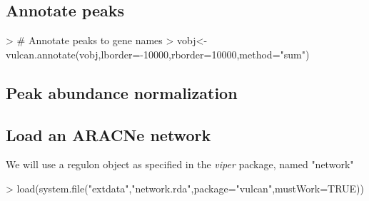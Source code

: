 \documentclass{article}
\begin{document}
\subsection{Annotate peaks}
\begin{Schunk}
\begin{Sinput}
> # Annotate peaks to gene names
> vobj<-vulcan.annotate(vobj,lborder=-10000,rborder=10000,method="sum")
\end{Sinput}
\end{Schunk}

\subsection{Peak abundance normalization}
\begin{Schunk}
\end{Schunk}

\subsection{Load an ARACNe network}
We will use a regulon object as specified in the \emph{viper} package, named "network"
\begin{Schunk}
\begin{Sinput}
> load(system.file("extdata","network.rda",package="vulcan",mustWork=TRUE))
\end{Sinput}
\end{Schunk}
\end{document}
